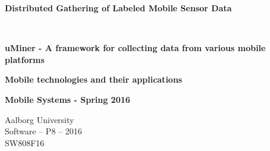 
\begin{center}
	
	\vspace{8cm}

	\begin{spacing}{2.1}
		\begin{Huge}
			\textbf{Distributed Gathering of Labeled Mobile Sensor Data}
		\end{Huge}
		\\
		\vspace{0.6cm}
		\begin{huge}
			\textbf{uMiner - A framework for collecting data from various mobile platforms}
		\end{huge}
	\end{spacing}

	\vspace{0.6cm}

	\begin{Large}
		\textbf{Mobile technologies and their applications}
	\end{Large}

	\vspace{1cm}

	\begin{large} 
		\textbf{Mobile Systems - Spring 2016}
	\end{large}

	\vspace*{\fill}

	\vspace*{\fill}

	Aalborg University		\\
	Software -- P8 -- 2016	\\
	SW808F16				\\

\end{center}



\thispagestyle{empty}